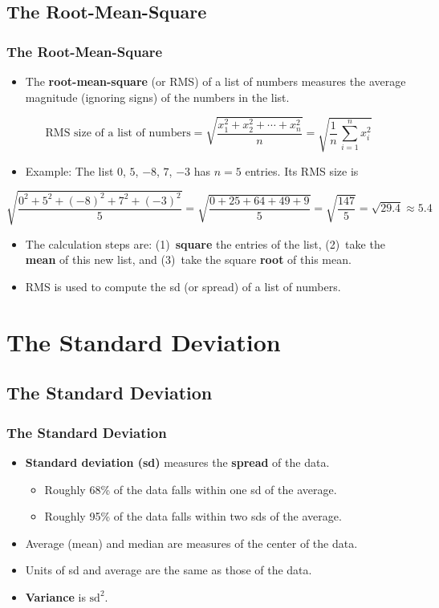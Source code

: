 \documentclass[t]{beamer}
\begin{document}
\subsection[RMS]{The Root-Mean-Square}
\begin{frame}[t]\frametitle{The Root-Mean-Square}

{\small
\begin{itemize}
\item The \textbf{root-mean-square} (or RMS) of a list of numbers measures the average magnitude (ignoring signs)
  of the numbers in the list.
\end{itemize}
\[\mbox{RMS size of a list of numbers} = \sqrt{\frac{x_1^2 + x_2^2 + \cdots + x_n^2}{n}} 
   = \sqrt{\frac{1}{n}\,\sum_{i=1}^n x_i^2}\]
\begin{itemize}
\item Example:   The list $0$, $5$, $-8$, $7$, $-3$ has $n=5$ entries.  Its RMS size is
\end{itemize}
{\footnotesize\[\sqrt{\frac{0^2+5^2+(-8)^2 + 7^2 + (-3)^2}{5}}=\sqrt{\frac{0+25+64+49+9}{5}}
   =\sqrt{\frac{147}{5}}=\sqrt{29.4}\approx 5.4\]}
\begin{itemize}
\item The calculation steps are:  (1)~{\color{blue}\textbf{square}} the entries of the list, 
  (2)~take the {\color{blue}\textbf{mean}} of this new list, and (3)~take
  the square {\color{blue}\textbf{root}} of this mean.
\item RMS is used to compute the sd (or spread) of a list of numbers.
\end{itemize}
}

\end{frame}


\section[SD]{The Standard Deviation}
\subsection[SD]{The Standard Deviation}
\begin{frame}[t]\frametitle{The Standard Deviation}
{\small
\begin{itemize}
\item \textbf{Standard deviation (sd)} measures the \textbf{spread} of the data.
   \begin{itemize}
   \item Roughly 68\% of the data falls within one sd of the average.
   \item Roughly 95\% of the data falls within two sds of the average.
   \end{itemize}
\item Average (mean) and median are measures of the center of the data.
\item Units of sd and average are the same as those of the data.
\item \textbf{Variance} is $\mbox{sd}^2$.
\end{itemize}


}
\end{frame}
\end{document}
